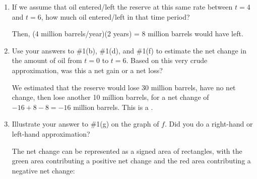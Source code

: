 \documentclass{article}
\begin{document}
\begin{enumerate}
\begin{enumerate}
    \begin{solution} 
      Since $f(4) = -4$, oil was leaving at a rate of 4 million barrels
      per year.
    \end{solution}

  \item
\begin{problem}[\stretch{0.5}]
      If we assume that oil entered/left the reserve at this same rate
      between $t = 4$ and $t = 6$, how much oil entered/left in that time
      period?
    \end{problem}

    \begin{solution}
      Then, (4 million barrels/year)(2 years) = 8 million barrels would
      have left.
    \end{solution}

  \item
\begin{problem}[\vfill]
      Use your answers to {{{{\#1}}(b)}},
      {{{{\#1}}(d)}}, and {{{{\#1}}(f)}} to
      estimate the net change in the amount of oil from $t = 0$ to $t =
      6$.  Based on this very crude approximation, was this a net gain or a
      net loss? 
    \end{problem}

    \begin{solution}
      We estimated that the reserve would lose 30 million barrels, have no
      net change, then lose another 10 million barrels, for a net
      change of $-16 + 8 - 8 = - 16$ million barrels.  This is a
      .
    \end{solution}

  \item
    \begin{problem}[\stretch{0.5}]
      Illustrate your answer to {{{{\#1}}(g)}} on the graph
      of $f$.  Did you do a right-hand or left-hand approximation? 
    \end{problem}

    \begin{solution} %
      The net change can be represented as a signed area of rectangles,
      with the green area contributing a positive net change and the red
      area contributing a negative net change:


\end{solution}
\end{enumerate}
\end{enumerate}
\end{document}
